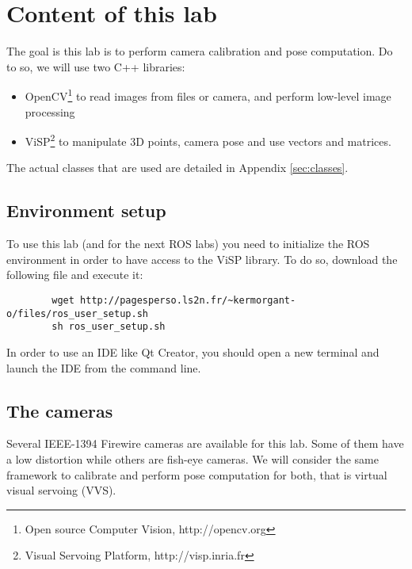 \documentclass{ecnreport}
\begin{document}




\section{Content of this lab}

The goal is this lab is to perform camera calibration and pose computation. Do to so, we will use two C++ libraries:
\begin{itemize}
 \item OpenCV\footnote{Open source Computer Vision, http://opencv.org} to read images from files or camera, and perform low-level image processing
 \item ViSP\footnote{Visual Servoing Platform, http://visp.inria.fr} to manipulate 3D points, camera pose and use vectors and matrices.
\end{itemize}
The actual classes that are used are detailed in Appendix \ref{sec:classes}.\\

\subsection{Environment setup}

To use this lab (and for the next ROS labs) you need to initialize the ROS environment in order to have access to the ViSP library.
To do so, download the following file and execute it:
\begin{center}\cppstyle
\begin{lstlisting}
        wget http://pagesperso.ls2n.fr/~kermorgant-o/files/ros_user_setup.sh
        sh ros_user_setup.sh
\end{lstlisting}
\end{center}In order to use an IDE like Qt Creator, you should open a new terminal and launch the IDE from the command line.

\subsection{The cameras}

Several IEEE-1394 Firewire cameras are available for this lab. Some of them have a low distortion while others are fish-eye cameras. We will consider the 
same framework to calibrate and perform pose computation for both, that is virtual visual servoing (VVS).
\end{document}
